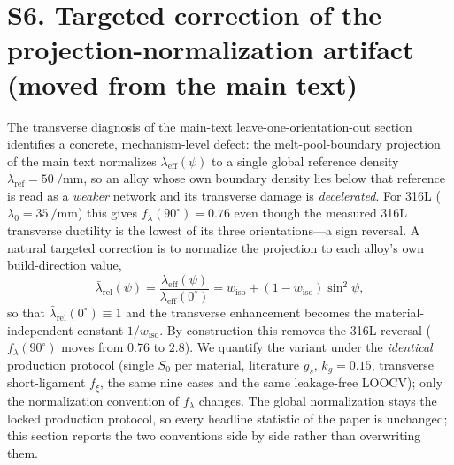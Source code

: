 \documentclass[12pt,a4paper,twocolumn]{article}
\providecommand{\ang}[1]{\ensuremath{#1^{\circ}}}
\begin{document}
\section*{S6. Targeted correction of the projection-normalization artifact (moved from the main text)}

The transverse diagnosis of the main-text leave-one-orientation-out section identifies a concrete, mechanism-level defect: the melt-pool-boundary projection of the main text normalizes $\lambda_{\mathrm{eff}}(\psi)$ to a single global reference density $\lambda_{\mathrm{ref}}=\SI{50}{\per\milli\meter}$, so an alloy whose own boundary density lies below that reference is read as a \emph{weaker} network and its transverse damage is \emph{decelerated}. For 316L ($\lambda_0=\SI{35}{\per\milli\meter}$) this gives $f_\lambda(\ang{90})=0.76$ even though the measured 316L transverse ductility is the lowest of its three orientations---a sign reversal. A natural targeted correction is to normalize the projection to each alloy's own build-direction value,
\begin{equation}
\bar\lambda_{\mathrm{rel}}(\psi)=\frac{\lambda_{\mathrm{eff}}(\psi)}{\lambda_{\mathrm{eff}}(0^\circ)}=w_{\mathrm{iso}}+(1-w_{\mathrm{iso}})\sin^2\psi,
\label{eq:f_lambda_rel}
\end{equation}
so that $\bar\lambda_{\mathrm{rel}}(\ang{0})\equiv1$ and the transverse enhancement becomes the material-independent constant $1/w_{\mathrm{iso}}$. By construction this removes the 316L reversal ($f_\lambda(\ang{90})$ moves from $0.76$ to $2.8$). We quantify the variant under the \emph{identical} production protocol (single $S_0$ per material, literature $g_s$, $k_g=0.15$, transverse short-ligament $f_\xi$, the same nine cases and the same leakage-free LOOCV); only the normalization convention of $f_\lambda$ changes. The global normalization stays the locked production protocol, so every headline statistic of the paper is unchanged; this section reports the two conventions side by side rather than overwriting them.
\end{document}
